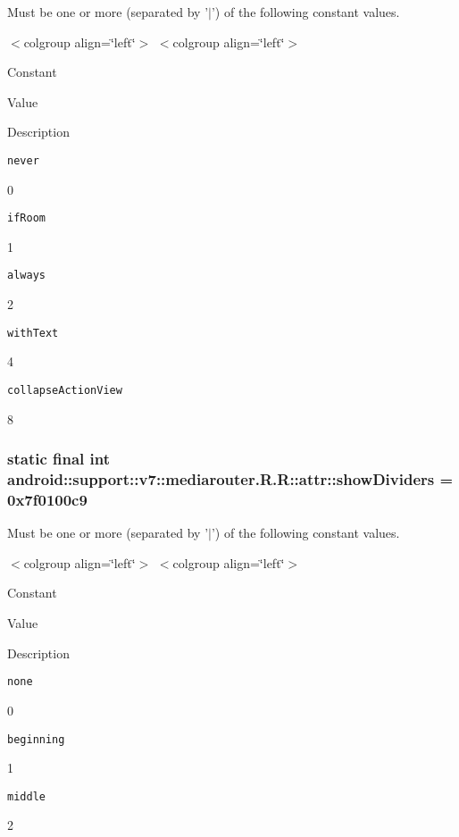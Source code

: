Must be one or more (separated by '$|$') of the following constant values. \begin{TabularC}{0}
\hline
\end{TabularC}
$<$colgroup align=\char`\"{}left\char`\"{}$>$ $<$colgroup align=\char`\"{}left\char`\"{}$>$ 

Constant

Value

Description 

{\tt never}

0

{\tt ifRoom}

1

{\tt always}

2

{\tt withText}

4

{\tt collapseActionView}

8\hypertarget{classandroid_1_1support_1_1v7_1_1mediarouter_1_1_r_1_1attr_2d983b639c9f03592f7f06a9b01404ba}{
\subsubsection[{showDividers}]{\setlength{\rightskip}{0pt plus 5cm}static final int android::support::v7::mediarouter.R.R::attr::showDividers = 0x7f0100c9}}
\label{classandroid_1_1support_1_1v7_1_1mediarouter_1_1_r_1_1attr_2d983b639c9f03592f7f06a9b01404ba}


Must be one or more (separated by '$|$') of the following constant values. \begin{TabularC}{0}
\hline
\end{TabularC}
$<$colgroup align=\char`\"{}left\char`\"{}$>$ $<$colgroup align=\char`\"{}left\char`\"{}$>$ 

Constant

Value

Description 

{\tt none}

0

{\tt beginning}

1

{\tt middle}

2

